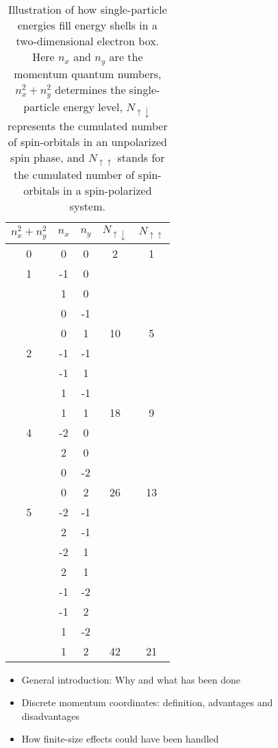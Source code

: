 \documentclass[a4paper,12pt]{report}
\begin{document}
\begin{table}
  \begin{center}
  \begin{tabular}{c|c|c|c|c}
    $n_{x}^{2}+n_{y}^{2}$ & $n_{x}$ & $n_{y}$ & 
    $N_{\uparrow \downarrow }$ & $N_{\uparrow \uparrow }$ \\
    \hline
    0 & 0 & 0 & 2 & 1 \\
    \hline
    1 & -1 &  0 & & \\
    &  1 &  0 & & \\
    &  0 & -1 & & \\
    &  0 &  1 & 10 & 5 \\
    \hline
    2  & -1 & -1 & & \\
    & -1 &  1 & & \\
    &  1 & -1 & & \\
    &  1 &  1 & 18 & 9 \\
    \hline
    4  & -2 & 0 & & \\
    &  2 & 0 & & \\
    &  0 & -2 & & \\
    &  0 &  2 & 26 & 13 \\
    \hline
    5  & -2 & -1 & & \\
    &  2 & -1 & & \\
    & -2 &  1 & & \\
    &  2 &  1 & & \\
    & -1 & -2 & & \\
    & -1 &  2 & & \\
    &  1 & -2 & & \\
    &  1 &  2 & 42 & 21 \\
    \hline
  \end{tabular}
  \end{center}
  \caption{Illustration of how single-particle energies
    fill energy shells in a two-dimensional electron box.
  Here $n_{x}$ and $n_{y}$ are the momentum quantum numbers,
  $n_{x}^{2} + n_{y}^{2}$ determines the single-particle 
  energy level, $N_{\uparrow \downarrow }$ represents the 
  cumulated number of spin-orbitals in an unpolarized spin
  phase, and $N_{\uparrow \uparrow }$ stands for the
  cumulated number of spin-orbitals in a spin-polarized
  system.} 
  \label{tab:orbitals_2dheg}
\end{table}

\begin{itemize}
\item General introduction: Why and what has been done
\item Discrete momentum coordinates: definition, advantages and \\
  disadvantages
\item How finite-size effects could have been handled
\end{itemize}
\end{document}
